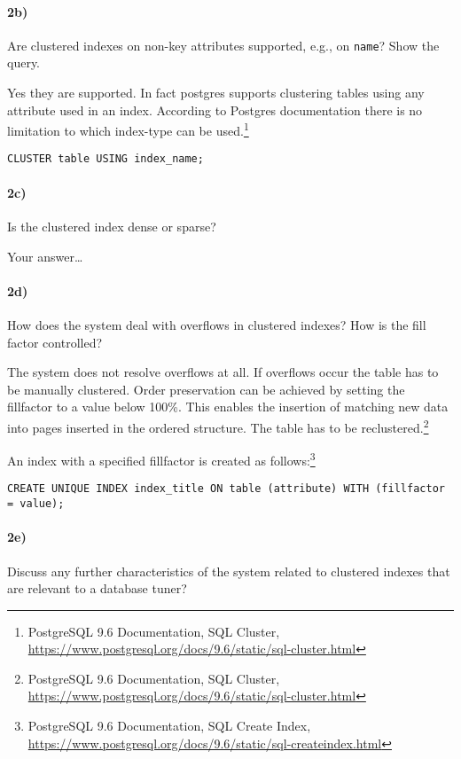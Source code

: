 \documentclass[11pt]{scrartcl}
\begin{document}
\paragraph{2b)} Are clustered indexes on non-key attributes supported, e.g.,
on {\tt name}?  Show the query.

Yes they are supported. In fact postgres supports clustering tables using any attribute used in an index.
According to Postgres documentation there is no limitation to which index-type can be used.\footnote{PostgreSQL 9.6
  Documentation, SQL Cluster,
  \url{https://www.postgresql.org/docs/9.6/static/sql-cluster.html}}

\begin{verbatim}
CLUSTER table USING index_name;
\end{verbatim}


\paragraph{2c)} Is the clustered index dense or sparse?


\smallskip

Your answer\dots

\paragraph{2d)} How does the system deal with overflows in clustered indexes?
How is the fill factor controlled?

The system does not resolve overflows at all. If overflows occur the table has to be manually clustered. Order preservation
can be achieved by setting the fillfactor to a value below 100\%. This enables the insertion of matching new data into pages
inserted in the ordered structure. The table has to be reclustered.\footnote{PostgreSQL 9.6
  Documentation, SQL Cluster,
  \url{https://www.postgresql.org/docs/9.6/static/sql-cluster.html}}


An index with a specified fillfactor is created as follows:\footnote{PostgreSQL 9.6
  Documentation, SQL Create Index,
  \url{https://www.postgresql.org/docs/9.6/static/sql-createindex.html}}
\begin{verbatim}
CREATE UNIQUE INDEX index_title ON table (attribute) WITH (fillfactor = value);
\end{verbatim}



\paragraph{2e)} Discuss any further characteristics of the system
related to clustered indexes that are relevant to a database
tuner?
\end{document}

